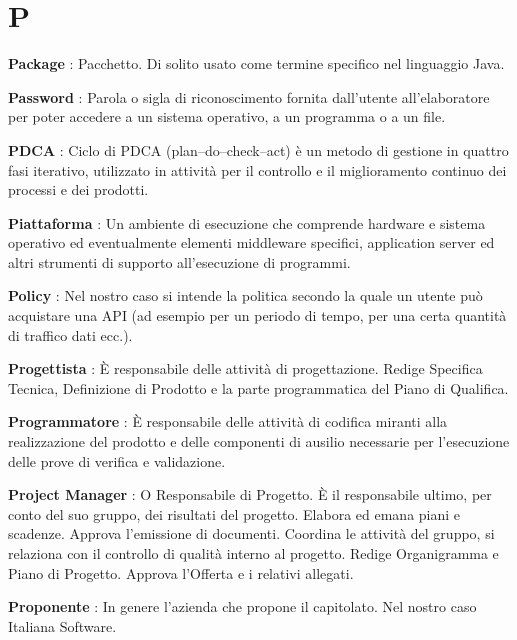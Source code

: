 \documentclass[12pt,a4paper,titlepage]{article}
\begin{document}
\section{P}
\begin{trivlist}
\item \textbf{Package} : Pacchetto. Di solito usato come termine specifico nel linguaggio Java.
\item \textbf{Password} : Parola o sigla di riconoscimento fornita dall'utente all'elaboratore per poter accedere a un sistema operativo, a un programma o a un file.
\item \textbf{PDCA} : Ciclo di PDCA  (plan–do–check–act) è un metodo di gestione in quattro fasi iterativo, utilizzato in attività per il controllo e il miglioramento continuo dei processi e dei prodotti.
\item \textbf{Piattaforma} : Un ambiente di esecuzione che comprende hardware e sistema operativo ed eventualmente elementi middleware specifici, application server ed altri strumenti di supporto all'esecuzione di programmi.
\item \textbf{Policy} : Nel nostro caso si intende la politica secondo la quale un utente può acquistare una API (ad esempio per un periodo di tempo, per una certa quantità di traffico dati ecc.).
\item \textbf{Progettista} : È responsabile delle attività di progettazione. Redige Specifica Tecnica, Definizione di Prodotto e la parte programmatica del Piano di Qualifica.
\item \textbf{Programmatore} : È responsabile delle attività di codifica miranti alla realizzazione del prodotto e delle componenti di ausilio necessarie per l'esecuzione delle prove di verifica e validazione.
\item \textbf{Project Manager} : O Responsabile di Progetto. È il responsabile ultimo, per conto del suo gruppo, dei risultati del progetto. Elabora ed emana piani e scadenze. Approva l'emissione di documenti. Coordina le attività del gruppo, si relaziona con il controllo di qualità interno al progetto. Redige Organigramma e Piano di Progetto. Approva l'Offerta e i relativi allegati.
\item \textbf{Proponente} : In genere l'azienda che propone il capitolato. Nel nostro caso Italiana Software.
\end{trivlist}

\end{document}
